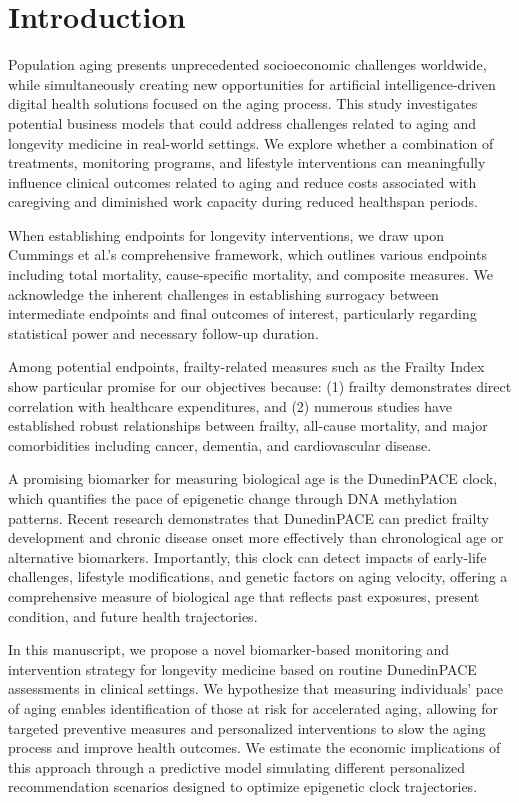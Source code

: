 \documentclass[12pt,a4paper]{article}
\begin{document}
\section{Introduction}
Population aging presents unprecedented socioeconomic challenges worldwide\cite{Ruckstuhl2023}, while simultaneously creating new opportunities for artificial intelligence-driven digital health solutions focused on the aging process. This study investigates potential business models that could address challenges related to aging and longevity medicine in real-world settings. We explore whether a combination of treatments, monitoring programs, and lifestyle interventions can meaningfully influence clinical outcomes related to aging and reduce costs associated with caregiving and diminished work capacity during reduced healthspan periods.

When establishing endpoints for longevity interventions, we draw upon Cummings et al.'s comprehensive framework\cite{Cummings2022}, which outlines various endpoints including total mortality, cause-specific mortality, and composite measures. We acknowledge the inherent challenges in establishing surrogacy between intermediate endpoints and final outcomes of interest, particularly regarding statistical power and necessary follow-up duration.

Among potential endpoints, frailty-related measures such as the Frailty Index\cite{Rockwood2005} show particular promise for our objectives because: (1) frailty demonstrates direct correlation with healthcare expenditures\cite{Hoogendijk2019}, and (2) numerous studies have established robust relationships between frailty, all-cause mortality, and major comorbidities including cancer, dementia, and cardiovascular disease.

A promising biomarker for measuring biological age is the DunedinPACE clock, which quantifies the pace of epigenetic change through DNA methylation patterns. Recent research demonstrates that DunedinPACE can predict frailty development and chronic disease onset more effectively than chronological age or alternative biomarkers\cite{Mak2023}. Importantly, this clock can detect impacts of early-life challenges, lifestyle modifications, and genetic factors on aging velocity, offering a comprehensive measure of biological age that reflects past exposures, present condition, and future health trajectories.

In this manuscript, we propose a novel biomarker-based monitoring and intervention strategy for longevity medicine based on routine DunedinPACE assessments in clinical settings. We hypothesize that measuring individuals' pace of aging enables identification of those at risk for accelerated aging, allowing for targeted preventive measures and personalized interventions to slow the aging process and improve health outcomes. We estimate the economic implications of this approach through a predictive model simulating different personalized recommendation scenarios designed to optimize epigenetic clock trajectories.
\end{document}
